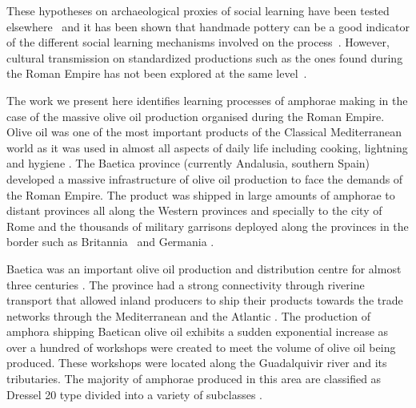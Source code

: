 \documentclass[review]{elsarticle}
\begin{document}
These hypotheses on archaeological proxies of social learning have been tested elsewhere~\citep{roux_standardization_2015} and it has been shown that handmade pottery can be a good indicator of the different social learning mechanisms involved on the process~\citep{neiman_stylistic_1995, shennan_ceramic_2001, steele_james_ceramic_2010}. However, cultural transmission on standardized productions such as the ones found during the Roman Empire has not been explored at the same level~\citep{bevan_mediterranean_2014}.

The work we present here identifies learning processes of amphorae making in the case of the massive olive oil production organised during the Roman Empire. Olive oil was one of the most important products of the Classical Mediterranean world as it was used in almost all aspects of daily life including cooking, lightning and hygiene \citep{mattingly_d.j._oil_1988}. The Baetica province (currently Andalusia, southern Spain) developed a massive infrastructure of olive oil production to face the demands of the Roman Empire. The product was shipped in large amounts of amphorae to distant provinces all along the Western provinces and specially to the city of Rome and the thousands of military garrisons deployed along the provinces in the border such as Britannia~\citep{monfort_britannia_1998,funari_economic_2005} and Germania \citep{remesal_annona_1986}. 

Baetica was an important olive oil production and distribution centre for almost three centuries \citep{millet_anforas_1998, rodriguez_baetican_1998,chic2005comercio,rodriguez_economioleicola_1977}. The province had a strong connectivity through riverine transport that allowed inland producers to ship their products towards the trade networks through the Mediterranean and the Atlantic \citep{garcia_vargas_enrique_formal_2010}. The production of amphora shipping Baetican olive oil exhibits a sudden exponential increase as over a hundred of workshops were created to meet the volume of olive oil being produced. These workshops were located along the Guadalquivir river and its tributaries. The majority of amphorae produced in this area are classified as Dressel 20 type divided into a variety of subclasses \citep{martin-kilcher_romischen_1994,berni_millet_epigrafianforica_2008}.
\end{document}
